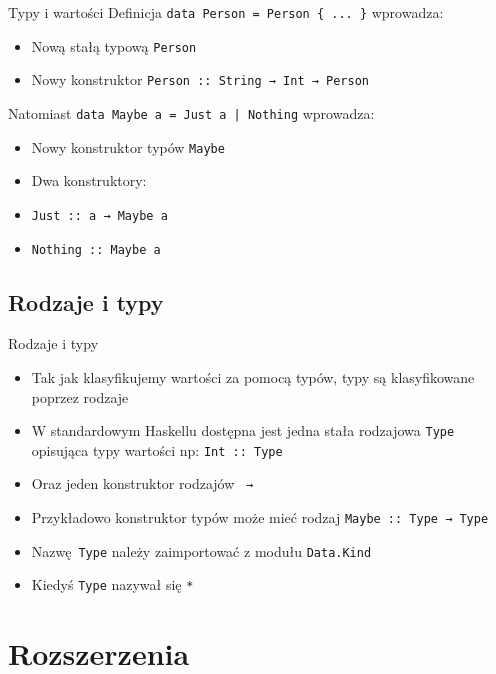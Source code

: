 \documentclass{beamer}
\begin{document}
\begin{frame}[fragile]{Typy i wartości}
  Definicja \lstinline!data Person = Person { ... }! wprowadza:
  \begin{itemize}
    \item Nową stałą typową \lstinline!Person!
    \item Nowy konstruktor \lstinline!Person :: String → Int → Person!
  \end{itemize}
  \vspace{1em}
  Natomiast \lstinline!data Maybe a = Just a | Nothing! wprowadza:
  \begin{itemize}
    \item Nowy konstruktor typów \lstinline!Maybe!
    \item Dwa konstruktory:
    \item \lstinline!Just :: a → Maybe a!
    \item \lstinline!Nothing :: Maybe a!
  \end{itemize}
\end{frame}


\subsection{Rodzaje i typy}
\begin{frame}[fragile]{Rodzaje i typy}
  \begin{itemize}
    \item Tak jak klasyfikujemy wartości za pomocą typów, typy są klasyfikowane poprzez rodzaje
    \item W standardowym Haskellu dostępna jest jedna stała rodzajowa \lstinline!Type! opisująca typy wartości np: \lstinline!Int :: Type!
    \item Oraz jeden konstruktor rodzajów \lstinline{ →}
    \item Przykładowo konstruktor typów może mieć rodzaj \lstinline!Maybe :: Type → Type!
    \item Nazwę \lstinline{Type} należy zaimportować z modułu \lstinline{Data.Kind}
    \item Kiedyś \lstinline{Type} nazywał się \lstinline{*}
  \end{itemize}
\end{frame}


\section{Rozszerzenia}
\end{document}
